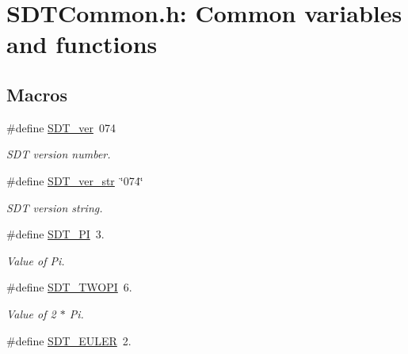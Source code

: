 \hypertarget{group__common}{}\section{S\+D\+T\+Common.\+h\+: Common variables and functions}
\label{group__common}
\subsection*{Macros}
\begin{DoxyCompactItemize}
\item 
\hypertarget{group__common_gab6e61b5e260d784833e230a33efc6a48}{}\#define \hyperlink{group__common_gab6e61b5e260d784833e230a33efc6a48}{S\+D\+T\+\_\+ver}~074\label{group__common_gab6e61b5e260d784833e230a33efc6a48}

\begin{DoxyCompactList}\small\item\em S\+D\+T version number. \end{DoxyCompactList}\item 
\hypertarget{group__common_gaf8d98d86bcb77f3f61403b29483527d5}{}\#define \hyperlink{group__common_gaf8d98d86bcb77f3f61403b29483527d5}{S\+D\+T\+\_\+ver\+\_\+str}~\char`\"{}074\char`\"{}\label{group__common_gaf8d98d86bcb77f3f61403b29483527d5}

\begin{DoxyCompactList}\small\item\em S\+D\+T version string. \end{DoxyCompactList}\item 
\hypertarget{group__common_ga292e893120950fc4c58e10d6a56beeb9}{}\#define \hyperlink{group__common_ga292e893120950fc4c58e10d6a56beeb9}{S\+D\+T\+\_\+\+P\+I}~3.\label{group__common_ga292e893120950fc4c58e10d6a56beeb9}

\begin{DoxyCompactList}\small\item\em Value of Pi. \end{DoxyCompactList}\item 
\hypertarget{group__common_gac8193381f9a9cbb3203c93e0f1cd2502}{}\#define \hyperlink{group__common_gac8193381f9a9cbb3203c93e0f1cd2502}{S\+D\+T\+\_\+\+T\+W\+O\+P\+I}~6.\label{group__common_gac8193381f9a9cbb3203c93e0f1cd2502}

\begin{DoxyCompactList}\small\item\em Value of 2 $\ast$ Pi. \end{DoxyCompactList}\item 
\hypertarget{group__common_ga70e01d4fd1e52279bd5b66f3130551a2}{}\#define \hyperlink{group__common_ga70e01d4fd1e52279bd5b66f3130551a2}{S\+D\+T\+\_\+\+E\+U\+L\+E\+R}~2.\label{group__common_ga70e01d4fd1e52279bd5b66f3130551a2}


\end{DoxyCompactItemize}
